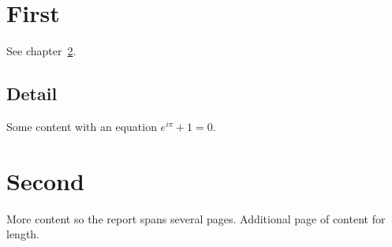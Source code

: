 \documentclass[12pt]{report}
\begin{document}
\tableofcontents
\chapter{First}
\label{ch:first}
See chapter~\ref{ch:second}.
\section{Detail}
Some content with an equation $e^{i\pi}+1=0$.
\chapter{Second}
\label{ch:second}
More content so the report spans several pages.
\newpage
Additional page of content for length.
\end{document}
